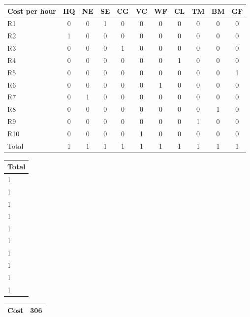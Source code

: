 \begin{center}
\begin{tabular}{|l|c|c|c|c|c|c|c|c|c|c|}
\hline
Cost per hour & HQ & NE & SE & CG & VC & WF & CL & TM & BM & GF \\
\hline
R1 & 0 & 0 & 1 & 0 & 0 & 0 & 0 & 0 & 0 & 0 \\
\hline
R2 & 1 & 0 & 0 & 0 & 0 & 0 & 0 & 0 & 0 & 0 \\
\hline
R3 & 0 & 0 & 0 & 1 & 0 & 0 & 0 & 0 & 0 & 0 \\
\hline
R4 & 0 & 0 & 0 & 0 & 0 & 0 & 1 & 0 & 0 & 0 \\
\hline
R5 & 0 & 0 & 0 & 0 & 0 & 0 & 0 & 0 & 0 & 1 \\
\hline
R6 & 0 & 0 & 0 & 0 & 0 & 1 & 0 & 0 & 0 & 0 \\
\hline
R7 & 0 & 1 & 0 & 0 & 0 & 0 & 0 & 0 & 0 & 0 \\
\hline
R8 & 0 & 0 & 0 & 0 & 0 & 0 & 0 & 0 & 1 & 0 \\
\hline
R9 & 0 & 0 & 0 & 0 & 0 & 0 & 0 & 1 & 0 & 0 \\
\hline
R10 & 0 & 0 & 0 & 0 & 1 & 0 & 0 & 0 & 0 & 0 \\
\hline
Total & 1 & 1 & 1 & 1 & 1 & 1 & 1 & 1 & 1 & 1 \\
\hline
\end{tabular}
\end{center}

\begin{center}
\begin{tabular}{|l|}
\hline
Total \\
\hline
1 \\
\hline
1 \\
\hline
1 \\
\hline
1 \\
\hline
1 \\
\hline
1 \\
\hline
1 \\
\hline
1 \\
\hline
1 \\
\hline
1 \\
\hline
\end{tabular}
\end{center}

\begin{center}
\begin{tabular}{|l|l|}
\hline
Cost & 306 \\
\hline
\end{tabular}
\end{center}


